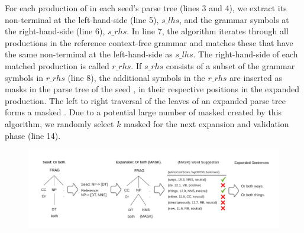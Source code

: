 


For each production of in each seed's parse tree (lines 3 and 4), we
extract its non-terminal at the left-hand-side (line 5), $s\_lhs$, and
the grammar symbols at the right-hand-side (line 6), $s\_rhs$. In line
7, the algorithm iterates through all productions in the reference
context-free grammar and matches these that have the same non-terminal
at the left-hand-side as $s\_lhs$.  The right-hand-side of each
matched production is called $r\_rhs$.  If $s\_rhs$ consists of a
subset of the grammar symbols in $r\_rhs$ (line 8), the additional
symbols in the $r\_rhs$ are inserted as masks in the parse tree of
the seed \sent, in their respective positions in the expanded production.
The left to right traversal of the leaves of an expanded parse tree
forms a masked \sent.  Due to a potential large number of masked \sents created by this algorithm, we randomly select $k$
masked \sents for the next \sent expansion and validation phase (line 14).

\begin{figure}[t]
  \centering
  \includegraphics[scale=0.7]{figs/running_example.pdf}
  \vspace{-5mm}
  \caption{\RunningExCaption}
\end{figure}

